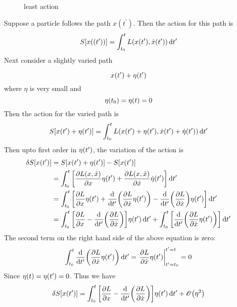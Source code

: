 		\begin{figure}
			\caption{least action}
		\end{figure}
		Suppose a particle follows the path $x(t^\prime)$. Then the action for this path is
		\begin{equation}
			S\qty[x(\qty(t^\prime))] = \int_{t_0}^{t} L(x(t^\prime), \dot{x}(t^\prime)) \dd{t^\prime}
		\end{equation}
		Next consider a slightly varied path
		
		\begin{equation}
			x\qty(t^\prime) + \eta\qty(t^\prime)
		\end{equation}
		where $\eta$ is very small and 
		\begin{equation}
			\eta\qty(t_0) = \eta\qty(t) = 0
		\end{equation}
		Then the action for the varied path is 
		\begin{equation}
			S\qty[x(t^\prime) + \eta\qty(t^\prime)] = \int_{t_0}^{t} L\qty(x\qty(t^\prime) + \eta\qty(t^\prime), \dot{x}\qty(t^\prime) + \dot{\eta}\qty(t^\prime)) \dd{t^\prime}
		\end{equation}
		Then upto first order in $\eta\qty(t^\prime)$, the variation of the action is
		\begin{align*}
			\var{S\qty[x\qty(t^\prime)]} 
			&= S\qty[x\qty(t^\prime) + \eta\qty(t^\prime)] - S\qty[x\qty(t^\prime)] \\
			&= \int_{t_0}^{t} \qty[\pdv{L\qty(x, \dot{x})}{x} \eta\qty(t^\prime)  + \pdv{L\qty(x, \dot{x})}{\dot{x}} \dot{\eta}\qty(t^\prime)] \dd{t^\prime} \\
			&= \int_{t_0}^{t} \qty[\pdv{L}{x}\eta\qty(t^\prime) + \dv{t^\prime}\qty(\pdv{L}{\dot{x}} \eta\qty(t^\prime))  - \dv{t^\prime}\qty(\pdv{L}{\dot{x}}) \eta\qty(t^\prime)] \dd{t^\prime} \\
			&= \int_{t_0}^{t} \qty[\pdv{L}{x}  -
			 \dv{t^\prime}\qty(\pdv{L}{\dot{x}})] \eta\qty(t^\prime) \dd{t^\prime}
			 + \int_{t_0}^{t} \qty[
			 \dv{t^\prime}\qty(\pdv{L}{\dot{x}} \eta\qty(t^\prime))] \dd{t^\prime}
		\end{align*}
		The second term on the right hand side of the above equation is zero:
		\begin{equation}
			\int_{t_0}^{t} \dv{t^\prime}\qty(\pdv{L}{\dot{x}} \eta\qty(t^\prime)) \dd{t^\prime} = \eval{\pdv{L}{\dot{x}}\eta\qty(t^\prime)}_{t^\prime=t_0}^{t^\prime=t} = 0
		\end{equation}
		Since $\eta\qty(t) = \eta\qty(t^\prime) =0$. Thus we have
		\begin{equation}
			\var{S\qty[x\qty(t^\prime)]}  = \int_{t_0}^{t} \qty[\pdv{L}{x}  -
			\dv{t^\prime}\qty(\pdv{L}{\dot{x}})] \eta\qty(t^\prime) \dd{t^\prime} + \order{\eta^2}
		\end{equation}
